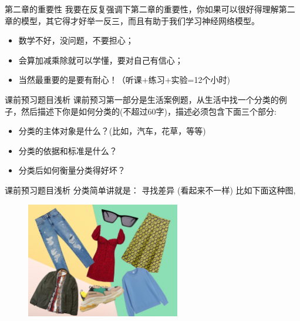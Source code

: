 \documentclass[handout]{ctexbeamer}
\begin{document}
\begin{frame}{第二章的重要性}
	我要在反复强调下第二章的重要性，你如果可以很好得理解第二章的模型，其它得才好举一反三，而且有助于我们学习神经网络模型。
	
	\hfil
	
	\begin{itemize}
	\setlength\itemsep{1em}
		\item 数学不好，没问题，不要担心；
		\item 会算加减乘除就可以学懂，要对自己有信心；
		\item 当然最重要的是要有耐心！（听课+练习+实验=12个小时)
	\end{itemize}
\end{frame}

\begin{frame}{课前预习题目浅析}
	课前预习第一部分是生活案例题，从生活中找一个分类的例子，然后描述下你是如何分类的(不超过60字)，描述必须包含下面三个部分:
	
	\hfil
	
\begin{itemize}
\setlength\itemsep{1em}
	\item 分类的主体对象是什么？(比如，汽车，花草，等等)
	\item 分类的依据和标准是什么？
	\item 分类后如何衡量分类得好坏？
\end{itemize}
\end{frame}

\begin{frame}[fragile]{课前预习题目浅析}
分类简单讲就是： 寻找差异 (看起来不一样) 比如下面这种图,
\begin{figure}[H]
	\centering
	\includegraphics[width=0.6\textwidth]{fig/clothes}
\end{figure}
\end{frame}
\end{document}
